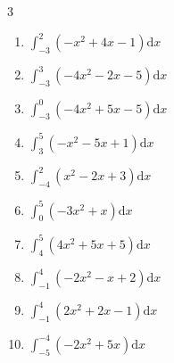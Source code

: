 \begin{multicols}{3}
\begin{enumerate}
        \phantom{$\displaystyle =49$}

  \item $\displaystyle \int_{-3}^{2}\left( -x^{2}+4x-1 \right) \mathrm{d}x$


  \item $\displaystyle \int_{-3}^{3}\left( -4x^{2}-2x-5 \right) \mathrm{d}x$

        \phantom{$\displaystyle =-77$}

\columnbreak %

  \item $\displaystyle \int_{-3}^{0}\left( -4x^{2}+5x-5 \right) \mathrm{d}x$

        \phantom{$\displaystyle =-61$}

  \item $\displaystyle \int_{3}^{5}\left( -x^{2}-5x+1 \right) \mathrm{d}x$


  \item $\displaystyle \int_{-4}^{2}\left( x^{2}-2x+3 \right) \mathrm{d}x$

        \phantom{$\displaystyle =39$}

  \item $\displaystyle \int_{0}^{5}\left( -3x^{2}+x \right) \mathrm{d}x$


  \item $\displaystyle \int_{4}^{5}\left( 4x^{2}+5x+5 \right) \mathrm{d}x$


\columnbreak %

\resetques

  \item $\displaystyle \int_{-1}^{4}\left( -2x^{2}-x+2 \right) \mathrm{d}x$


  \item $\displaystyle \int_{-1}^{4}\left( 2x^{2}+2x-1 \right) \mathrm{d}x$


  \item $\displaystyle \int_{-5}^{-4}\left( -2x^{2}+5x \right) \mathrm{d}x$



\end{enumerate}
\end{multicols}
